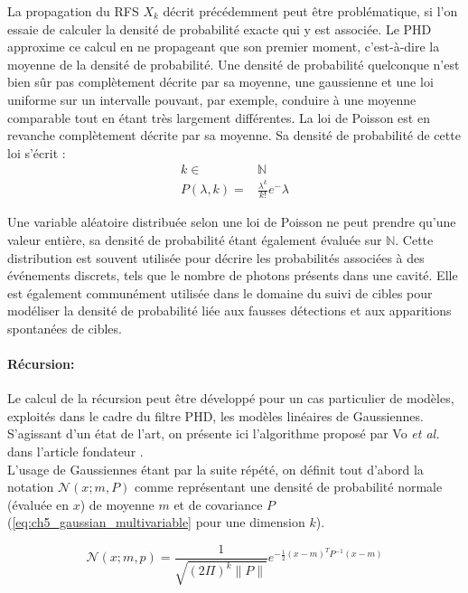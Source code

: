 La propagation du RFS $X_k$ décrit précédemment peut être problématique, si l'on essaie de calculer la densité de probabilité exacte qui y est associée. Le PHD approxime ce calcul en ne propageant que son premier moment, c'est-à-dire la moyenne de la densité de probabilité. Une densité de probabilité quelconque n'est bien sûr pas complètement décrite par sa moyenne, une gaussienne et une loi uniforme sur un intervalle pouvant, par exemple, conduire à une moyenne comparable tout en étant très largement différentes. La loi de Poisson est en revanche complètement décrite par sa moyenne. Sa densité de probabilité de cette loi s'écrit :
\begin{align}
	k \in& \mathbb{N} \\
	P(\lambda, k) =& \frac{\lambda^k}{k !} e^-\lambda
\end{align}

Une variable aléatoire distribuée selon une loi de Poisson ne peut prendre qu'une valeur entière, sa densité de probabilité étant également évaluée sur $\mathbb{N}$. Cette distribution est souvent utilisée pour décrire les probabilités associées à des événements discrets, tels que le nombre de photons présents dans une cavité. Elle est également communément utilisée dans le domaine du suivi de cibles pour modéliser la densité de probabilité liée aux fausses détections et aux apparitions spontanées de cibles.

\paragraph{Récursion:\\}
Le calcul de la récursion peut être développé pour un cas particulier de modèles, exploités dans le cadre du filtre PHD, les modèles linéaires de Gaussiennes. S'agissant d'un état de l'art, on présente ici l'algorithme proposé par Vo \textit{et al.} dans l'article fondateur \cite{Vo2006a}.\\ 
L'usage de Gaussiennes étant par la suite répété, on définit tout d'abord la notation $\mathcal{N}(x; m, P)$ comme représentant une densité de probabilité normale (évaluée en $x$) de moyenne $m$ et de covariance $P$ (\ref{eq:ch5_gaussian_multivariable} pour une dimension $k$). 

\begin{equation}
	\mathcal{N}(x; m,p) = \frac{1}{\sqrt{ (2 \Pi)^k \| P \| }} e^{-\frac{1}{2} (x-m)^T P^{-1} (x-m)}
	\label{eq:ch5_gaussian_multivariable}
\end{equation}

